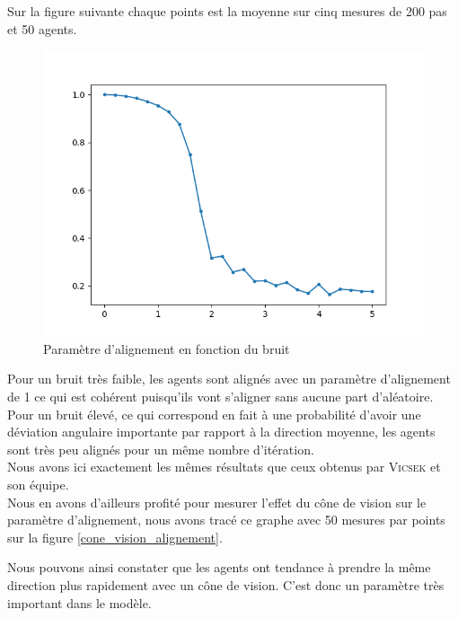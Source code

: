 \documentclass[french, a4paper, 12pt, openany]{report}
\begin{document}
	Sur la figure suivante chaque points est la moyenne sur cinq mesures de 200 pas et 50 agents.
	\begin{figure}[!h]
		\centering
		\includegraphics[width=12cm]{images/bruit_4.png}
		\caption{Paramètre d'alignement en fonction du bruit}
	\end{figure}
	
	Pour un bruit très faible, les agents sont alignés avec un paramètre d'alignement de 1 ce qui est cohérent puisqu'ils vont s'aligner sans aucune part d'aléatoire. Pour un bruit élevé, ce qui correspond en fait à une probabilité d'avoir une déviation angulaire importante par rapport à la direction moyenne, les agents sont très peu alignés pour un même nombre d'itération. \\
	
	Nous avons ici exactement les mêmes résultats que ceux obtenus par \textsc{\textsc{Vicsek}} et son équipe.\\
	
	Nous en avons d'ailleurs profité pour mesurer l'effet du cône de vision sur le paramètre d'alignement, nous avons tracé ce graphe avec 50 mesures par points sur la figure \ref{cone_vision_alignement}. 
	
	Nous pouvons ainsi constater que les agents ont tendance à prendre la même direction plus rapidement avec un cône de vision. C'est donc un paramètre très important dans le modèle.
	
\end{document}
